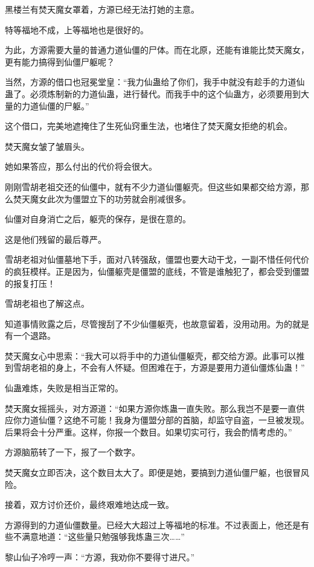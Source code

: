 
\begin{this_body}

黑楼兰有焚天魔女罩着，方源已经无法打她的主意。

特等福地不成，上等福地也是很好的。

为此，方源需要大量的普通力道仙僵的尸体。而在北原，还能有谁能比焚天魔女，更有能力搞得到仙僵尸躯呢？

当然，方源的借口也冠冕堂皇：“我力仙蛊给了你们，我手中就没有趁手的力道仙蛊了。必须炼制新的力道仙蛊，进行替代。而我手中的这个仙蛊方，必须要用到大量的力道仙僵的尸躯。”

这个借口，完美地遮掩住了生死仙窍重生法，也堵住了焚天魔女拒绝的机会。

焚天魔女皱了皱眉头。

她如果答应，那么付出的代价将会很大。

刚刚雪胡老祖交还的仙僵中，就有不少力道仙僵躯壳。但这些如果都交给方源，那么焚天魔女此次为僵盟立下的功劳就会削减很多。

仙僵对自身消亡之后，躯壳的保存，是很在意的。

这是他们残留的最后尊严。

雪胡老祖对仙僵墓地下手，面对八转强敌，僵盟也要大动干戈，一副不惜任何代价的疯狂模样。正是因为，仙僵躯壳是僵盟的底线，不管是谁触犯了，都会受到僵盟的报复打压！

雪胡老祖也了解这点。

知道事情败露之后，尽管搜刮了不少仙僵躯壳，也故意留着，没用动用。为的就是有一个退路。

焚天魔女心中思索：“我大可以将手中的力道仙僵躯壳，都交给方源。此事可以推到雪胡老祖的身上，不会有人怀疑。但困难在于，方源是要用力道仙僵炼仙蛊！”

仙蛊难炼，失败是相当正常的。

焚天魔女摇摇头，对方源道：“如果方源你炼蛊一直失败。那么我岂不是要一直供应你力道仙僵？这绝不可能！我身为僵盟分部的首脑，却监守自盗，一旦被发现。后果将会十分严重。这样，你报一个数目。如果切实可行，我会酌情考虑的。”

方源脑筋转了一下，报了一个数字。

焚天魔女立即否决，这个数目太大了。即便是她，要搞到力道仙僵尸躯，也很冒风险。

接着，双方讨价还价，最终艰难地达成一致。

方源得到的力道仙僵数量。已经大大超过上等福地的标准。不过表面上，他还是有些不满意地道：“这些量只勉强够我炼蛊三次……”

黎山仙子冷哼一声：“方源，我劝你不要得寸进尺。”


\end{this_body}
